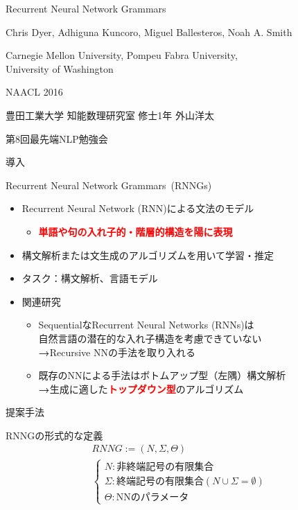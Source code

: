 \documentclass[aspectratio=43,unicode,10pt]{beamer}
\title{\thetitle}
\author{Chris Dyer et al.}
\newcommand{\fire}[1]{\textcolor{red}{\textbf{#1}}}
\newcommand{\arrow}{\textcolor{ttiblue}{\textbf{→}}\hspace{1ex}}
\newcommand{\term}{終端記号}
\newcommand{\nt}{非終端記号}
\newcommand{\thetitle}{Recurrent Neural Network Grammars}
\begin{document}
\begin{frame}
  \centering
  {\LARGE \thetitle \par}
  \vspace{3ex}
  Chris Dyer, Adhiguna Kuncoro, Miguel Ballesteros, Noah A. Smith \par
  \vspace{0.5ex}
  {\small Carnegie Mellon University, Pompeu Fabra University, \\ University of Washington \par
  \vspace{0.5ex}
  NAACL 2016 \par}
  \vspace{3ex}
  豊田工業大学 知能数理研究室 修士1年 外山洋太 \par
  第8回最先端NLP勉強会
\end{frame}

\begin{frame}{導入}
  \begin{block}{\thetitle~(RNNGs)}
    \begin{itemize}
      \item Recurrent Neural Network (RNN)による文法のモデル
        \begin{itemize}
          \item \fire{単語や句の入れ子的・階層的構造を陽に表現}
        \end{itemize}
      \item 構文解析または文生成のアルゴリズムを用いて学習・推定
      \item タスク：構文解析、言語モデル
      \item 関連研究
        \begin{itemize}
          \item SequentialなRecurrent Neural Networks (RNNs)は \\
                自然言語の潜在的な入れ子構造を考慮できていない \\
                \arrow Recursive NNの手法を取り入れる
          \item 既存のNNによる手法はボトムアップ型（左隅）構文解析 \\
                \arrow 生成に適した\fire{トップダウン型}のアルゴリズム
        \end{itemize}
    \end{itemize}
  \end{block}
\end{frame}

\begin{frame}{提案手法}
  \begin{block}{RNNGの形式的な定義}
    \begin{gather*}
      RNNG := (N, \Sigma, \Theta) \\
      \begin{cases}
        N: \text{\nt の有限集合} \\
        \Sigma: \text{\term の有限集合} (N \cup \Sigma = \emptyset) \\
        \Theta: \text{NNのパラメータ}
      \end{cases}
    \end{gather*}
  \end{block}
\end{frame}
\end{document}

